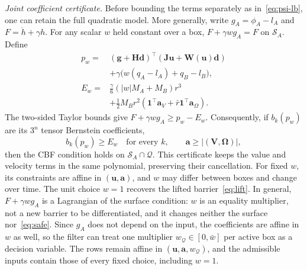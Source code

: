 \documentclass[journal]{IEEEtran}
\theoremstyle{definition}
\begin{document}
\emph{Joint coefficient certificate.} Before bounding the terms separately as
in~\eqref{eq:psi-lb}, one can retain the full quadratic model. More generally, write
$g_A=\phi_A-l_A$ and $F=\dot h+\gamma h$. For any scalar $w$ held constant over a box,
$F+\gamma w g_A=F$ on $\mathcal S_A$. Define
\begin{equation}\label{eq:joint-model}
\begin{aligned}
p_w={}&(\mathbf g+\mathbf H\mathbf d)^\top
              (\mathbf J\mathbf u+\mathbf W(\mathbf u)\mathbf d)\\
 &+\gamma\big(w(q_A-l_A)+q_B-l_B\big),\\
E_w={}&\tfrac\gamma6(|w|M_A+M_B)r^3\\
 &+\tfrac12M_Br^2(\mathbf1^\top\mathbf a_V+
                       \bar r\mathbf1^\top\mathbf a_\Omega).
\end{aligned}
\end{equation}
The two-sided Taylor bounds give $F+\gamma w g_A\ge p_w-E_w$.
Consequently, if $b_k(p_w)$ are its $3^n$ tensor Bernstein coefficients,
\begin{equation}\label{eq:joint-coef}
b_k(p_w)\ge E_w\quad\text{for every }k,\qquad
\mathbf a\ge|(\mathbf V,\boldsymbol\Omega)|,
\end{equation}
then the CBF condition holds on $\mathcal S_A\cap\mathcal Q$. This certificate keeps
the value and velocity terms in the same polynomial, preserving their cancellation.
For fixed $w$, its constraints are affine in $(\mathbf u,\mathbf a)$, and $w$ may differ between
boxes and change over time. The unit choice $w=1$ recovers the lifted barrier~\eqref{eq:lift}. In
general, $F+\gamma wg_A$ is a Lagrangian of the surface condition: $w$ is an equality multiplier,
not a new barrier to be differentiated, and it changes neither the surface nor~\eqref{eq:safe}.
Since $g_A$ does not depend on the input, the coefficients are affine in $w$ as well, so the filter
can treat one multiplier $w_{\mathcal Q}\in[0,\bar w]$ per active box as a decision variable. The
rows remain affine in $(\mathbf u,\mathbf a,w_{\mathcal Q})$, and the admissible inputs contain those
of every fixed choice, including $w=1$.
\end{document}
